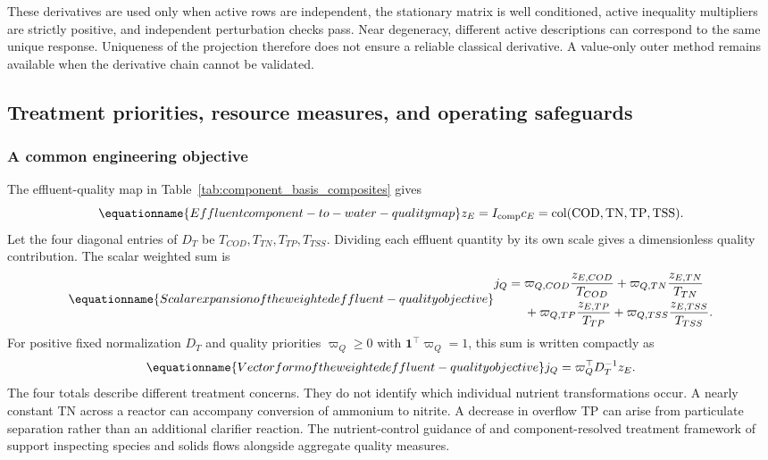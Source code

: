 These derivatives are used only when active rows are independent, the stationary matrix is well conditioned, active inequality multipliers are strictly positive, and independent perturbation checks pass. Near degeneracy, different active descriptions can correspond to the same unique response. Uniqueness of the projection therefore does not ensure a reliable classical derivative. A value-only outer method remains available when the derivative chain cannot be validated.

\subsection{Treatment priorities, resource measures, and operating safeguards}

\subsubsection{A common engineering objective}

The effluent-quality map in Table~\ref{tab:component_basis_composites} gives
\begin{equation}
\equationname{Effluent component-to-water-quality map}
z_E=I_{\rm comp}c_E=\operatorname{col}(\mathrm{COD},\mathrm{TN},\mathrm{TP},\mathrm{TSS}).
\end{equation}
Let the four diagonal entries of $D_T$ be $T_{COD},T_{TN},T_{TP},T_{TSS}$. Dividing each effluent quantity by its own scale gives a dimensionless quality contribution. The scalar weighted sum is
\begin{equation}
\equationname{Scalar expansion of the weighted effluent-quality objective}
\begin{aligned}
j_Q={}&\varpi_{Q,COD}\frac{z_{E,COD}}{T_{COD}}
+\varpi_{Q,TN}\frac{z_{E,TN}}{T_{TN}}\\
&+\varpi_{Q,TP}\frac{z_{E,TP}}{T_{TP}}
+\varpi_{Q,TSS}\frac{z_{E,TSS}}{T_{TSS}}.
\end{aligned}
\end{equation}
For positive fixed normalization $D_T$ and quality priorities $\varpi_Q\ge0$ with $\mathbf1^\top\varpi_Q=1$, this sum is written compactly as
\begin{equation}
\equationname{Vector form of the weighted effluent-quality objective}
j_Q=\varpi_Q^\top D_T^{-1}z_E.
\label{eq:plant_quality_objective}
\end{equation}
The four totals describe different treatment concerns. They do not identify which individual nutrient transformations occur. A nearly constant TN across a reactor can accompany conversion of ammonium to nitrite. A decrease in overflow TP can arise from particulate separation rather than an additional clarifier reaction. The nutrient-control guidance of \citet{USEPA2009} and component-resolved treatment framework of \citet{Zhang2026} support inspecting species and solids flows alongside aggregate quality measures.

